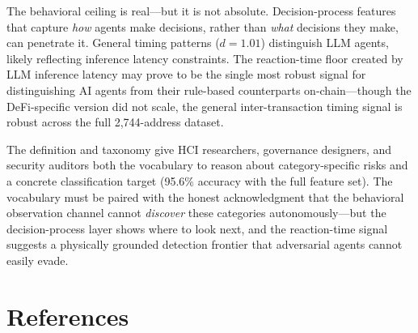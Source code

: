 \documentclass[sigconf,nonacm=false]{acmart}
\begin{document}
The behavioral ceiling is real---but it is not absolute. Decision-process features that capture \emph{how} agents make decisions, rather than \emph{what} decisions they make, can penetrate it. General timing patterns ($d{=}1.01$) distinguish LLM agents, likely reflecting inference latency constraints. The reaction-time floor created by LLM inference latency may prove to be the single most robust signal for distinguishing AI agents from their rule-based counterparts on-chain---though the DeFi-specific version did not scale, the general inter-transaction timing signal is robust across the full 2,744-address dataset.

The definition and taxonomy give HCI researchers, governance designers, and security auditors both the vocabulary to reason about category-specific risks and a concrete classification target (95.6\% accuracy with the full feature set). The vocabulary must be paired with the honest acknowledgment that the behavioral observation channel cannot \emph{discover} these categories autonomously---but the decision-process layer shows where to look next, and the reaction-time signal suggests a physically grounded detection frontier that adversarial agents cannot easily evade.


\section{References}





\end{document}
